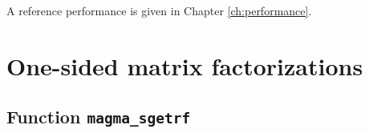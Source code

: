 \documentclass[10pt]{book}
\begin{document}
\vspace{0.1in}
A reference performance is given in Chapter \ref{ch:performance}. 


\footnotesize

\newpage
\section{One-sided matrix factorizations}

\newpage
\subsection{Function {\tt {\bf magma\_sgetrf}}}
\end{document}
